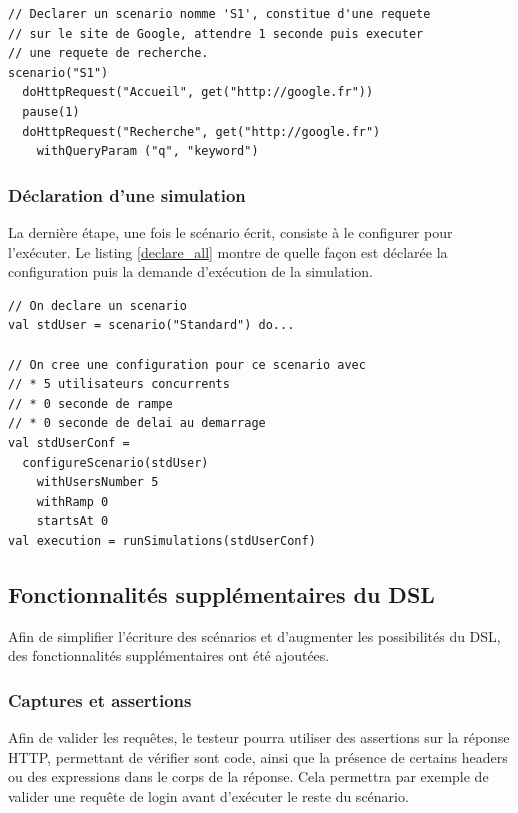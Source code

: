 \begin{lstlisting}[caption={Déclaration d'un scénario simple},label={declare_scenario}]
// Declarer un scenario nomme 'S1', constitue d'une requete 
// sur le site de Google, attendre 1 seconde puis executer 
// une requete de recherche.
scenario("S1")
  doHttpRequest("Accueil", get("http://google.fr"))
  pause(1)
  doHttpRequest("Recherche", get("http://google.fr") 
    withQueryParam ("q", "keyword")
\end{lstlisting}

\subsubsection{Déclaration d'une simulation}

La dernière étape, une fois le scénario écrit, consiste à le configurer pour l'exécuter. Le listing \ref{declare_all} montre de quelle façon est déclarée la configuration puis la demande d'exécution de la simulation.

\begin{lstlisting}[caption={Déclaration d'une simulation au complet},label={declare_all}]
// On declare un scenario
val stdUser = scenario("Standard") do...

// On cree une configuration pour ce scenario avec
// * 5 utilisateurs concurrents
// * 0 seconde de rampe
// * 0 seconde de delai au demarrage
val stdUserConf = 
  configureScenario(stdUser)
    withUsersNumber 5 
    withRamp 0
    startsAt 0
val execution = runSimulations(stdUserConf)
\end{lstlisting}

\subsection{Fonctionnalités supplémentaires du DSL}
Afin de simplifier l'écriture des scénarios et d'augmenter les possibilités du DSL, des fonctionnalités supplémentaires ont été ajoutées.

\subsubsection{Captures et assertions}
Afin de valider les requêtes, le testeur pourra utiliser des assertions sur la réponse HTTP, permettant de vérifier sont code, ainsi que la présence de certains headers ou des expressions dans le corps de la réponse. Cela permettra par exemple de valider une requête de login avant d'exécuter le reste du scénario. 

